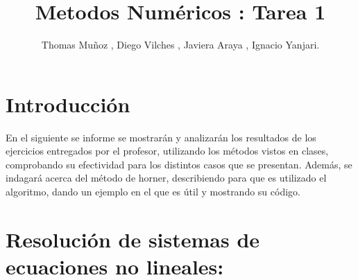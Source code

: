 \documentclass{udpreport}
\title{Metodos Numéricos : Tarea 1}
\author{Thomas Muñoz , Diego Vilches , Javiera Araya , Ignacio Yanjari.}
\begin{document}
\maketitle


\chapter{Introducción}

En el siguiente se informe se mostrarán y analizarán los resultados de los ejercicios entregados por el profesor, utilizando los métodos vistos en clases, comprobando su efectividad para los distintos casos que se presentan. Además, se indagará acerca del método de horner, describiendo para que es utilizado el algoritmo, dando un ejemplo en el que es útil y mostrando su código.

\chapter{Resolución de sistemas de ecuaciones no lineales:}
\end{document}
